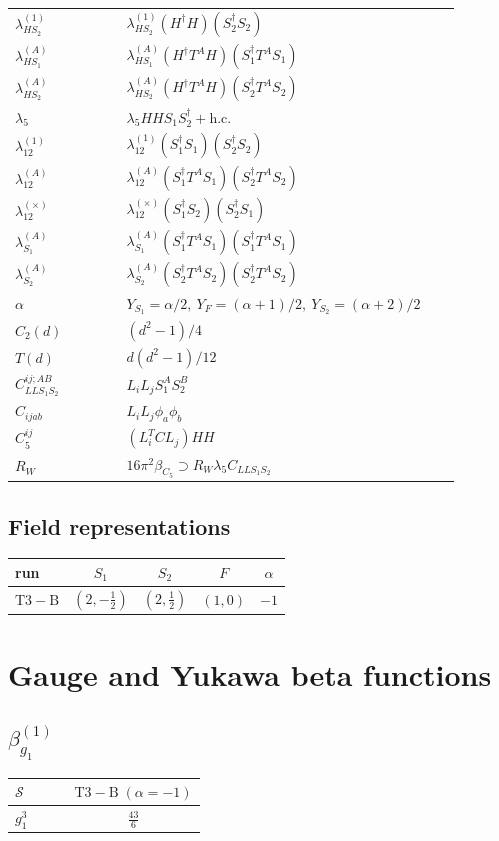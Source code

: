 \documentclass[9pt]{article}
\begin{document}
\begin{longtable}{@{}p{0.23\linewidth}p{0.69\linewidth}@{}}
$\lambda_{HS_2}^{(1)}$ & $\lambda_{HS_2}^{(1)}(H^\dagger H)(S_2^\dagger S_2)$ \\
$\lambda_{HS_1}^{(A)}$ & $\lambda_{HS_1}^{(A)}(H^\dagger T^AH)(S_1^\dagger T^AS_1)$ \\
$\lambda_{HS_2}^{(A)}$ & $\lambda_{HS_2}^{(A)}(H^\dagger T^AH)(S_2^\dagger T^AS_2)$ \\
$\lambda_5$ & $\lambda_5HHS_1S_2^\dagger+\mathrm{h.c.}$ \\
$\lambda_{12}^{(1)}$ & $\lambda_{12}^{(1)}(S_1^\dagger S_1)(S_2^\dagger S_2)$ \\
$\lambda_{12}^{(A)}$ & $\lambda_{12}^{(A)}(S_1^\dagger T^AS_1)(S_2^\dagger T^AS_2)$ \\
$\lambda_{12}^{(\times)}$ & $\lambda_{12}^{(\times)}(S_1^\dagger S_2)(S_2^\dagger S_1)$ \\
$\lambda_{S_1}^{(A)}$ & $\lambda_{S_1}^{(A)}(S_1^\dagger T^A S_1)(S_1^\dagger T^A S_1)$ \\
$\lambda_{S_2}^{(A)}$ & $\lambda_{S_2}^{(A)}(S_2^\dagger T^A S_2)(S_2^\dagger T^A S_2)$ \\
$\alpha$ & $Y_{S_1}=\alpha/2,\ Y_F=(\alpha+1)/2,\ Y_{S_2}=(\alpha+2)/2$ \\
$C_2(d)$ & $(d^2-1)/4$ \\
$T(d)$ & $d(d^2-1)/12$ \\
$C_{LLS_1S_2}^{ij;AB}$ & $L_iL_jS_1^AS_2^B$ \\
$C_{ijab}$ & $L_iL_j\phi_a\phi_b$ \\
$C_5^{ij}$ & $(L_i^TCL_j)HH$ \\
$R_W$ & $16\pi^2\beta_{C_5}\supset R_W\lambda_5C_{LLS_1S_2}$ \\
\bottomrule
\end{longtable}
\subsection*{Field representations}
\begin{longtable}{@{}lcccc@{}}
\toprule
run & $S_1$ & $S_2$ & $F$ & $\alpha$ \\
\midrule
$\mathrm{T3-B}$ & $(2,- \frac{1}{2})$ & $(2,\frac{1}{2})$ & $(1,0)$ & $-1$ \\
\bottomrule
\end{longtable}
\section*{Gauge and Yukawa beta functions}
\subsection*{$ \beta_{g_1}^{(1)} $}
\begin{longtable}{@{}p{0.38\linewidth}c@{}}
\toprule
$\mathcal{S}$ & $ \mathrm{T3-B}\;(\alpha=-1) $ \\
\midrule
$ g_1^3 $ & $ \frac{43}{6} $ \\
\bottomrule
\end{longtable}
\end{document}
